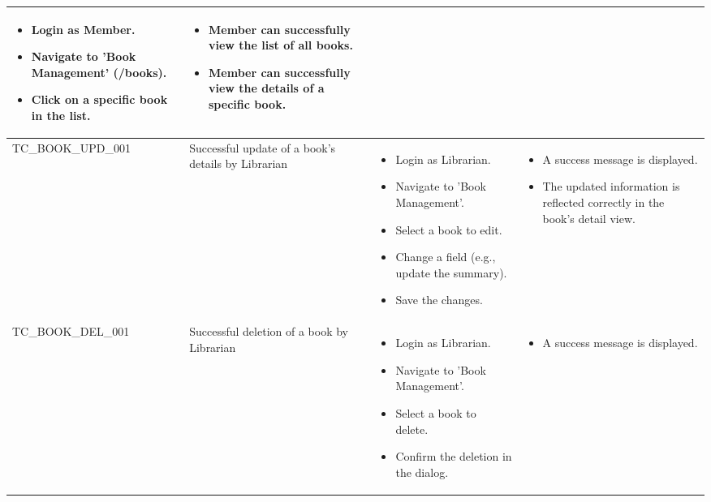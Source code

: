 \begin{longtable}{|>{\scriptsize\raggedright\arraybackslash}p{3.8cm}|>{\raggedright\arraybackslash}p{3.8cm}|>{\raggedright\arraybackslash}p{4cm}|>{\raggedright\arraybackslash}p{4cm}|}
\begin{itemize}[noitemsep, topsep=0pt, partopsep=0pt, leftmargin=*]
        \item Login as Member.
        \item Navigate to 'Book Management' (/books).
        \item Click on a specific book in the list.
    \end{itemize} &
    \begin{itemize}[noitemsep, topsep=0pt, partopsep=0pt, leftmargin=*]
        \item Member can successfully view the list of all books.
        \item Member can successfully view the details of a specific book.
    \end{itemize} \\ \hline
TC\_BOOK\_UPD\_001 & Successful update of a book's details by Librarian &
    \begin{itemize}[noitemsep, topsep=0pt, partopsep=0pt, leftmargin=*]
        \item Login as Librarian.
        \item Navigate to 'Book Management'.
        \item Select a book to edit.
        \item Change a field (e.g., update the summary).
        \item Save the changes.
    \end{itemize} &
    \begin{itemize}[noitemsep, topsep=0pt, partopsep=0pt, leftmargin=*]
        \item A success message is displayed.
        \item The updated information is reflected correctly in the book's detail view.
    \end{itemize} \\ \hline
TC\_BOOK\_DEL\_001 & Successful deletion of a book by Librarian &
    \begin{itemize}[noitemsep, topsep=0pt, partopsep=0pt, leftmargin=*]
        \item Login as Librarian.
        \item Navigate to 'Book Management'.
        \item Select a book to delete.
        \item Confirm the deletion in the dialog.
    \end{itemize} &
    \begin{itemize}[noitemsep, topsep=0pt, partopsep=0pt, leftmargin=*]
        \item A success message is displayed.

\end{itemize}
\end{longtable}
